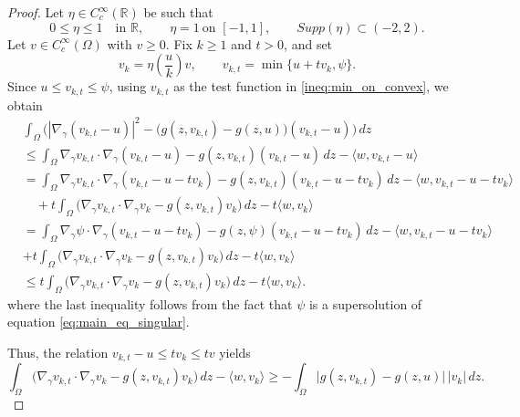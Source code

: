 \documentclass[10pt,a4paper]{amsart}
\newcommand{\gradgr}{\nabla_{\gamma}}
\begin{document}
\begin{proof}
Let $\eta \in C_c^\infty(\mathbb{R})$ be such that
\begin{equation*}
0 \le \eta \le 1 \quad \text{in } \mathbb{R}, \qquad
\eta = 1 \ \text{on } [-1,1], \qquad
Supp(\eta) \subset (-2,2).
\end{equation*}
Let $v \in C_c^\infty(\Omega)$ with $v \ge 0$. Fix $k \ge 1$ and $t > 0$, and set
\begin{equation*}
v_k = \eta\!\left( \frac{u}{k} \right) v,
\qquad
v_{k,t} = \min \{ u + t v_k , \psi \}.
\end{equation*}
Since $u \le v_{k,t} \le \psi$, using $v_{k,t}$ as the test function in \eqref{ineq:min_on_convex}, we obtain
\begin{align*}
&\int_\Omega
\Big(
|\gradgr (v_{k,t}-u)|^2
-
\big( g(z,v_{k,t}) - g(z,u) \big)
(v_{k,t}-u)
\Big)\,dz
 \\ &
\le
\int_\Omega
\gradgr v_{k,t} \cdot \gradgr (v_{k,t}-u)
-
g(z,v_{k,t})(v_{k,t}-u)\,dz
-
\langle w , v_{k,t}-u \rangle
\\ & =
\int_\Omega
\gradgr v_{k,t} \cdot \gradgr (v_{k,t}-u-t v_k)
-
g(z,v_{k,t})(v_{k,t}-u-t v_k)\,dz
-
\langle w , v_{k,t}-u-t v_k \rangle
\\
&\quad
+ t \int_\Omega
\big(
\gradgr v_{k,t} \cdot \gradgr v_k
-
g(z,v_{k,t}) v_k
\big)\,dz
-
t \langle w , v_k \rangle \\
& =
\int_\Omega
\gradgr \psi \cdot \gradgr (v_{k,t}-u-t v_k)
-
g(z,\psi)(v_{k,t}-u-t v_k)\,dz
-
\langle w , v_{k,t}-u-t v_k \rangle
\\
&+ t \int_\Omega
\big(
\gradgr v_{k,t} \cdot \gradgr v_k
-
g(z,v_{k,t}) v_k
\big)\,dz
-
t \langle w , v_k \rangle 
\\& \leq 
t \int_\Omega
\big(
\gradgr v_{k,t} \cdot \gradgr v_k
-
g(z,v_{k,t}) v_k
\big)\,dz
-
t \langle w , v_k \rangle.
\end{align*}
where the last inequality follows from the fact that $\psi$ is a supersolution of equation \eqref{eq:main_eq_singular}.

Thus, the relation $v_{k,t} - u \le t v_k \le t v$ yields
\begin{equation*}
\int_\Omega
\big(
\gradgr v_{k,t} \cdot \gradgr v_k
-
g(z,v_{k,t}) v_k
\big)\,dz
-
\langle w , v_k \rangle
\ge
-
\int_\Omega
\big| g(z,v_{k,t}) - g(z,u) \big|\, |v_k|\, dz .
\end{equation*}


\end{proof}
\end{document}
